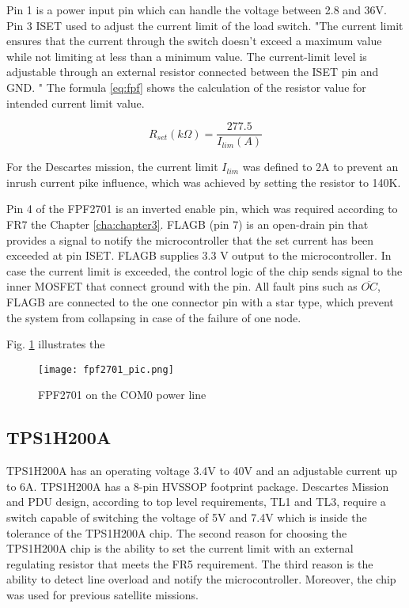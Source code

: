 Pin 1 is a power input pin which can handle the voltage between 2.8 and 36V. Pin 3 ISET used to adjust the current limit of the load switch. \cite{27} "The  current  limit  ensures  that  the  current  through  the switch  doesn't  exceed  a  maximum  value  while  not limiting  at  less  than  a  minimum  value.  The current-limit level    is    adjustable    through    an    external    resistor connected between the ISET pin and GND. " The formula \ref{eq:fpf} shows the calculation of the resistor value for intended current limit value.

\begin{equation}\label{eq:fpf}
R_{set}(k\Omega) = \frac{277.5}{I_{lim}(A)}
\end{equation}

For the Descartes mission, the current limit $I_{lim}$ was defined to 2A to prevent an inrush current pike influence, which was achieved by setting the resistor to 140K.

Pin 4 of the FPF2701 is an inverted enable pin, which was required according to FR7 the Chapter \ref{cha:chapter3}. FLAGB (pin 7) is an open-drain pin that provides a signal to notify the microcontroller that the set current has been exceeded at pin ISET. FLAGB supplies 3.3 V output to the microcontroller. In case the current limit is exceeded, the control logic of the chip sends signal to the inner MOSFET that connect ground with the pin. All fault pins such as $\overline{OC}$, FLAGB  are connected to the one connector pin with a star type, which prevent the system from collapsing in case of the failure of one node.

Fig. \ref{fig: fpf27_schema} illustrates the 

\begin{figure}[h]
	\centering
	\texttt{[image: fpf2701\_pic.png]}
	\caption{FPF2701 on the COM0 power line}
	\label{fig: fpf27_schema}
\end{figure} 

\subsection{TPS1H200A}

TPS1H200A \cite{28} has an operating voltage 3.4V to 40V and an adjustable current up to 6A. TPS1H200A has a 8-pin HVSSOP footprint package. Descartes Mission and PDU design, according to top level requirements, TL1 and TL3, require a switch capable of switching the voltage of 5V and 7.4V which is inside the tolerance of the TPS1H200A chip. The second reason for choosing the TPS1H200A chip is the ability to set the current limit with an external regulating resistor that meets the FR5 requirement. The third reason is the ability to detect line overload and notify the microcontroller. Moreover, the chip was used for previous satellite missions.\\


